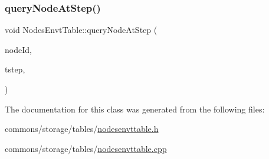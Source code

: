\mbox{\label{class_nodes_envt_table_a09d6dbe9524748152f1889b2d07ddcd6}} 
\subsubsection{\texorpdfstring{queryNodeAtStep()}{queryNodeAtStep()}}
{\footnotesize\ttfamily void Nodes\+Envt\+Table\+::query\+Node\+At\+Step (\begin{DoxyParamCaption}\item[{\mbox{\hyperlink{classtypes_1_1_node_id}{types\+::\+Node\+Id}}}]{node\+Id,  }\item[{\mbox{\hyperlink{namespacetypes_a9dc53a5ce11a196d82a6983030de8028}{types\+::tstep\+\_\+t}}}]{tstep,  }\item[{std\+::function$<$ bool(\mbox{\hyperlink{class_nodes_envt_table_adbc6a037efe1edee85eab03779c0b151}{Node\+Envt}} stat)$>$}]{ }\end{DoxyParamCaption})}



The documentation for this class was generated from the following files\+:\begin{DoxyCompactItemize}
\item 
commons/storage/tables/\mbox{\hyperlink{nodesenvttable_8h}{nodesenvttable.\+h}}\item 
commons/storage/tables/\mbox{\hyperlink{nodesenvttable_8cpp}{nodesenvttable.\+cpp}}\end{DoxyCompactItemize}
